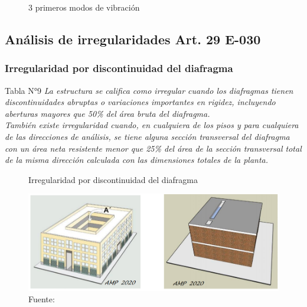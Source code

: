 \begin{figure}[!htbp]
\begin{center}
{        \label{Imagen-Londres}}
    \caption{3 primeros modos de vibración}
    \label{Figura-Ciudades}
  \end{center}
\end{figure}
\newpage

\subsection{Análisis de irregularidades Art. 29 E-030}
\subsubsection{Irregularidad por discontinuidad del diafragma}
\begin{mybox2}{Tabla N°9}
\textit{La estructura se califica como irregular cuando los diafragmas 
tienen discontinuidades abruptas o variaciones importantes en 
rigidez, incluyendo aberturas mayores que 50\% del área bruta 
del diafragma.}\\
\textit{También  existe  irregularidad  cuando,  en  cualquiera de  los 
pisos y para cualquiera de las direcciones de análisis, se tiene 
alguna sección transversal del diafragma con un área neta 
resistente menor que 25\% del área de la sección transversal 
total de la misma dirección calculada con las dimensiones 
totales de la planta.}
\end{mybox2}

\begin{figure}[h!]
    \centering
    \caption{Irregularidad por discontinuidad del diafragma}
    \includegraphics[scale=0.7]{IMAGENES/20.PNG}
    \caption*{\small Fuente: \it \cite{comen}}
    \label{fig:my_label}
    
\end{figure}

